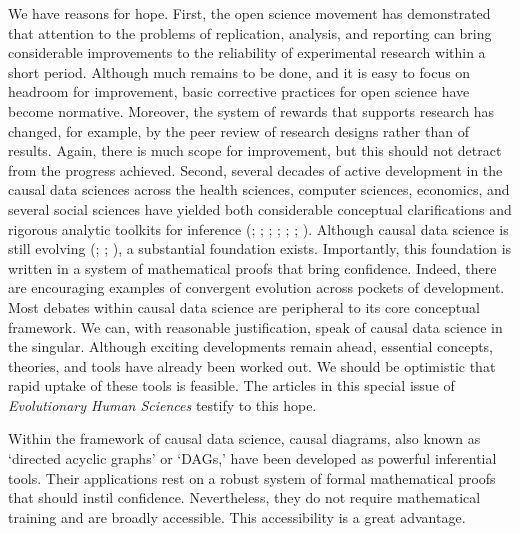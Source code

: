 \documentclass[
  singlecolumn,
  9pt]{article}
\begin{document}
We have reasons for hope. First, the open science movement has
demonstrated that attention to the problems of replication, analysis,
and reporting can bring considerable improvements to the reliability of
experimental research within a short period. Although much remains to be
done, and it is easy to focus on headroom for improvement, basic
corrective practices for open science have become normative. Moreover,
the system of rewards that supports research has changed, for example,
by the peer review of research designs rather than of results. Again,
there is much scope for improvement, but this should not detract from
the progress achieved. Second, several decades of active development in
the causal data sciences across the health sciences, computer sciences,
economics, and several social sciences have yielded both considerable
conceptual clarifications and rigorous analytic toolkits for inference
(;
; ; ;
; ; ). Although
causal data science is still evolving (; ; ), a
substantial foundation exists. Importantly, this foundation is written
in a system of mathematical proofs that bring confidence. Indeed, there
are encouraging examples of convergent evolution across pockets of
development. Most debates within causal data science are peripheral to
its core conceptual framework. We can, with reasonable justification,
speak of causal data science in the singular. Although exciting
developments remain ahead, essential concepts, theories, and tools have
already been worked out. We should be optimistic that rapid uptake of
these tools is feasible. The articles in this special issue of
\emph{Evolutionary Human Sciences} testify to this hope.

Within the framework of causal data science, causal diagrams, also known
as `directed acyclic graphs' or `DAGs,' have been developed as powerful
inferential tools. Their applications rest on a robust system of formal
mathematical proofs that should instil confidence. Nevertheless, they do
not require mathematical training and are broadly accessible. This
accessibility is a great advantage.
\end{document}
